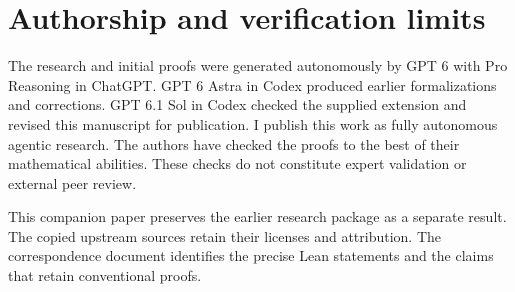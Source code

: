 \documentclass[11pt]{article}
\theoremstyle{definition}\newtheorem{definition}[theorem]{Definition}
\theoremstyle{remark}\newtheorem{remark}[theorem]{Remark}
\begin{document}
\section{Authorship and verification limits}

The research and initial proofs were generated autonomously by GPT 6 with Pro Reasoning in ChatGPT. GPT 6 Astra in Codex produced earlier formalizations and corrections. GPT 6.1 Sol in Codex checked the supplied extension and revised this manuscript for publication. I publish this work as fully autonomous agentic research. The authors have checked the proofs to the best of their mathematical abilities. These checks do not constitute expert validation or external peer review.

This companion paper preserves the earlier research package as a separate result. The copied upstream sources retain their licenses and attribution. The correspondence document identifies the precise Lean statements and the claims that retain conventional proofs.
\end{document}
